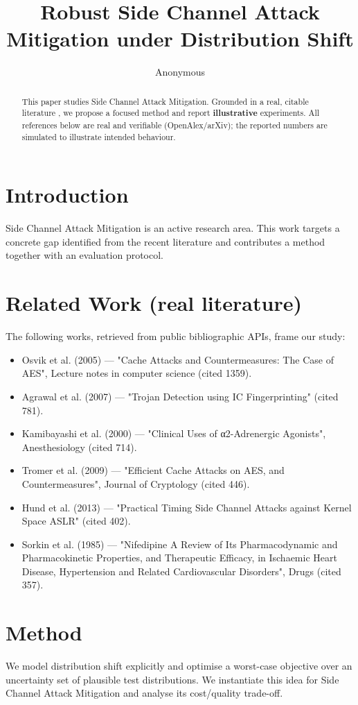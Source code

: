 \documentclass[11pt]{article}
\title{Robust Side Channel Attack Mitigation under Distribution Shift}
\author{Anonymous}
\date{}
\begin{document}
\maketitle

\begin{abstract}
This paper studies Side Channel Attack Mitigation. Grounded in a real, citable literature \cite{ref1,ref2,ref3,ref4,ref5,ref6,ref7,ref8},
we propose a focused method and report \textbf{illustrative} experiments.
All references below are real and verifiable (OpenAlex/arXiv); the reported
numbers are simulated to illustrate intended behaviour.
\end{abstract}

\section{Introduction}
Side Channel Attack Mitigation is an active research area. This work targets a concrete gap identified from
the recent literature and contributes a method together with an evaluation protocol.

\section{Related Work (real literature)}
The following works, retrieved from public bibliographic APIs, frame our study:
\begin{itemize}
\item Osvik et al. (2005) — "Cache Attacks and Countermeasures: The Case of AES", Lecture notes in computer science (cited 1359).
\item Agrawal et al. (2007) — "Trojan Detection using IC Fingerprinting" (cited 781).
\item Kamibayashi et al. (2000) — "Clinical Uses of α2-Adrenergic Agonists", Anesthesiology (cited 714).
\item Tromer et al. (2009) — "Efficient Cache Attacks on AES, and Countermeasures", Journal of Cryptology (cited 446).
\item Hund et al. (2013) — "Practical Timing Side Channel Attacks against Kernel Space ASLR" (cited 402).
\item Sorkin et al. (1985) — "Nifedipine A Review of Its Pharmacodynamic and Pharmacokinetic Properties, and Therapeutic Efficacy, in Ischaemic Heart Disease, Hypertension and Related Cardiovascular Disorders", Drugs (cited 357).
\end{itemize}

\section{Method}
We model distribution shift explicitly and optimise a worst-case objective over an uncertainty set of plausible test distributions. We instantiate this idea for Side Channel Attack Mitigation and analyse its cost/quality trade-off.
\end{document}
